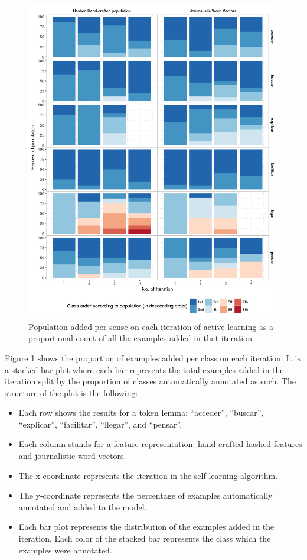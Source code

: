 \begin{figure}[htb!]
  \centering
  \includegraphics[height=0.9\textheight,width=\textwidth,keepaspectratio]
    {plots/active/population_add_per_class}
  \caption{Population added per sense on each iteration of active learning as a
  proportional count of all the examples added in that iteration}
  \label{fig:active:population_add_per_class}
\end{figure}

Figure \ref{fig:active:population_add_per_class} shows the proportion of
examples added per class on each iteration. It is a stacked bar plot where each
bar represents the total examples added in the iteration split by the
proportion of classes automatically annotated as such. The structure of the
plot is the following:

\begin{itemize}
  \item Each row shows the results for a token lemma: ``acceder'', ``buscar'',
    ``explicar'', ``facilitar'', ``llegar'', and ``pensar''.
  \item Each column stands for a feature representation: hand-crafted hashed
    features and journalistic word vectors.
  \item The x-coordinate represents the iteration in the self-learning
    algorithm.
  \item The y-coordinate represents the percentage of examples automatically
    annotated and added to the model.
  \item Each bar plot represents the distribution of the examples added in
    the iteration. Each color of the stacked bar represents the class
    which the examples were annotated.
\end{itemize}

